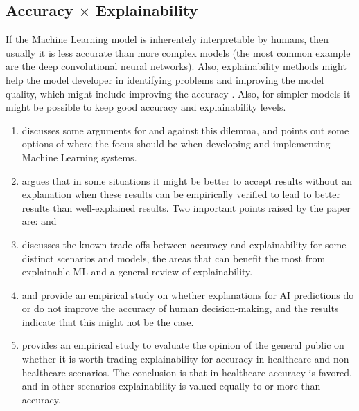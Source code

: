 \subsection{Accuracy $\times$ Explainability}

If the Machine Learning model is inherentely interpretable by humans, then usually it is less accurate than more complex models (the most common example are the deep convolutional neural networks). Also, explainability methods might help the model developer in identifying problems and improving the model quality, which might include improving the accuracy \cite{burkart2021survey}. Also, for simpler models it might be possible to keep good accuracy and explainability levels.

\begin{enumerate}
\item \cite{petkovic2023not} discusses some arguments for and against this dilemma, and points out some options of where the focus should be when developing and implementing Machine Learning systems.
\item \cite{london2019artificial} argues that in some situations it might be better to accept results without an explanation when these results can be empirically verified to lead to better results than well-explained results. Two important points raised by the paper are:  and 
\item \cite{angelov2021explainable} discusses the known trade-offs between accuracy and explainability for some distinct scenarios and models, the areas that can benefit the most from explainable ML and a general review of explainability.
\item \cite{bell2022s} and \cite{alufaisan2021does} provide an empirical study on whether explanations for AI predictions do or do not improve the accuracy of human decision-making, and the results indicate that this might not be the case.
\item \cite{van2021trading} provides an empirical study to evaluate the opinion of the general public on whether it is worth trading explainability for accuracy in healthcare and non-healthcare scenarios. The conclusion is that in healthcare accuracy is favored, and in other scenarios explainability is valued equally to or more than accuracy.
\end{enumerate}

